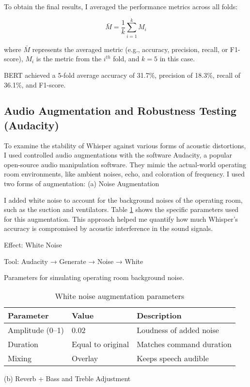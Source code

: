\documentclass[11pt,a4paper]{article}
\begin{document}
To obtain the final results, I averaged the performance metrics across all folds:


\begin{equation}
\bar{M} = \frac{1}{k} \sum_{i=1}^{k} M_i
\end{equation}

where $\bar{M}$ represents the averaged metric (e.g., accuracy, precision, recall, or F1-score), $M_i$ is the metric from the $i^{th}$ fold, and $k=5$ in this case.

BERT achieved a 5-fold average accuracy of 31.7\%, precision of 18.3\%, recall of 36.1\%, and F1-score.

\subsection{Audio Augmentation and Robustness Testing (Audacity)}
To examine the stability of Whisper against various forms of acoustic distortions, I used controlled audio augmentations with the software Audacity, a popular open-source audio manipulation software.
They mimic the actual-world operating room environments, like ambient noises, echo, and coloration of frequency.
I used two forms of augmentation:
(a) Noise Augmentation

I added white noise to account for the background noises of the operating room, such as the suction and ventilators. Table \ref{tab:noise_params} shows the specific parameters used for this augmentation. This approach helped me quantify how much Whisper's accuracy is compromised by acoustic interference in the sound signals.

Effect: White Noise

Tool: Audacity → Generate → Noise → White
\begin{table}[h]
\centering
\caption{White noise augmentation parameters}
\label{tab:noise_params}
Parameters for simulating operating room background noise.
{\small
\begin{tabular}{lll}
\hline
\textbf{Parameter} & \textbf{Value} & \textbf{Description} \\
\hline
Amplitude (0--1) & 0.02 & Loudness of added noise \\
Duration & Equal to original & Matches command duration \\
Mixing & Overlay & Keeps speech audible \\
\hline
\end{tabular}
}
\end{table}

(b) Reverb + Bass and Treble Adjustment
\end{document}
